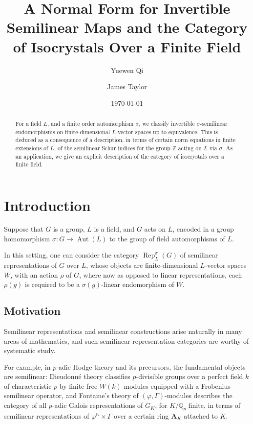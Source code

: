\documentclass[10pt, reqno, hidelinks]{amsart}
\title[A Normal Form for Invertible Semilinear Maps]{A Normal Form for Invertible Semilinear Maps and the Category of Isocrystals Over a Finite Field}
\date{\today}
\author{Yuewen Qi}
\author{James Taylor}
\DeclareMathOperator{\Rep}{Rep}
\DeclareMathOperator{\Aut}{Aut}
\newcommand{\bN}{{\mathbb N}}
\newcommand{\bZ}{{\mathbb Z}}
\numberwithin{thm}{subsection}
\theoremstyle{definition}
\begin{document}
\maketitle

\begin{abstract}
For a field $L$, and a finite order automorphism $\sigma$, we classify invertible $\sigma$-semilinear endomorphisms on finite-dimensional $L$-vector spaces up to equivalence. This is deduced as a consequence of a description, in terms of certain norm equations in finite extensions of $L$, of the semilinear Schur indices for the group $\bZ$ acting on $L$ via $\sigma$. As an application, we give an explicit description of the category of isocrystals over a finite field.
\end{abstract}

\vspace{-0.3cm}

\setcounter{tocdepth}{1}
\tableofcontents

\vspace{-1.2cm}

\section{Introduction}

Suppose that $G$ is a group, $L$ is a field, and $G$ acts on $L$, encoded in a group homomorphism $\sigma \colon G \rightarrow \Aut(L)$ to the group of field automorphisms of $L$.

In this setting, one can consider the category $\Rep_L^{\sigma}(G)$ of semilinear representations of $G$ over $L$, whose objects are finite-dimensional $L$-vector spaces $W$, with an action $\rho$ of $G$, where now as opposed to linear representations, each $\rho(g)$ is required to be a $\sigma(g)$-linear endomorphism of $W$.

\subsection*{Motivation}

Semilinear representations and semilinear constructions arise naturally in many areas of mathematics, and such semilinear representation categories are worthy of systematic study.

For example, in $p$-adic Hodge theory and its precursors, the fundamental objects are semilinear: Dieudonn\'{e} theory classifies $p$-divisible groups over a perfect field $k$ of characteristic $p$ by finite free $W(k)$-modules equipped with a Frobenius-semilinear operator, and Fontaine's theory of $(\varphi,\Gamma)$-modules describes the category of all $p$-adic Galois representations of $G_K$, for $K/\mathbb{Q}_p$ finite, in terms of semilinear representations of $\varphi^{\bN} \times \Gamma$ over a certain ring $\mathbf{A}_K$ attached to $K$.
\end{document}
